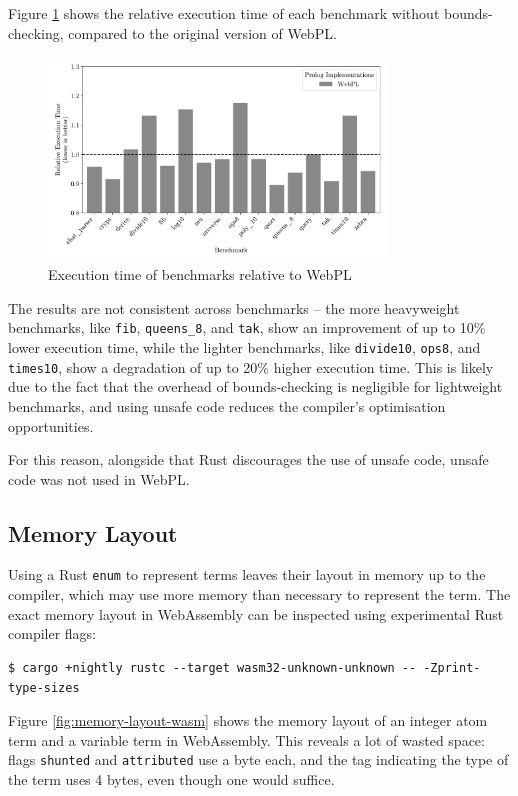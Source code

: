 Figure \ref{fig:unsafe} shows the relative execution time of each benchmark without bounds-checking, compared to the original version of WebPL.

\begin{figure}[H]
\centering
\includegraphics[width=0.8\textwidth]{relative_performance_unsafe.pdf}
\caption{Execution time of benchmarks relative to WebPL}
\label{fig:unsafe}
\end{figure}

The results are not consistent across benchmarks -- the more heavyweight benchmarks, like \texttt{fib}, \texttt{queens\_8}, and \texttt{tak}, show an improvement of up to 10\% lower execution time, while the lighter benchmarks, like \texttt{divide10}, \texttt{ops8}, and \texttt{times10}, show a degradation of up to 20\% higher execution time. This is likely due to the fact that the overhead of bounds-checking is negligible for lightweight benchmarks, and using unsafe code reduces the compiler's optimisation opportunities.

For this reason, alongside that Rust discourages the use of unsafe code, unsafe code was not used in WebPL.

\subsection{Memory Layout}

Using a Rust \texttt{enum} to represent terms leaves their layout in memory up to the compiler, which may use more memory than necessary to represent the term. The exact memory layout in WebAssembly can be inspected using experimental Rust compiler flags:

\begin{verbatim}
$ cargo +nightly rustc --target wasm32-unknown-unknown -- -Zprint-type-sizes
\end{verbatim}

Figure \ref{fig:memory-layout-wasm} shows the memory layout of an integer atom term and a variable term in WebAssembly. This reveals a lot of wasted space: flags \texttt{shunted} and \texttt{attributed} use a byte each, and the tag indicating the type of the term uses 4 bytes, even though one would suffice.

